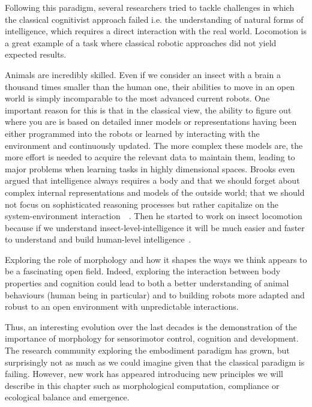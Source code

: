 Following this paradigm, several researchers tried to tackle challenges in which the classical cognitivist approach failed i.e. the understanding of natural forms of intelligence, which requires a direct interaction with the real world. Locomotion is a great example of a task where classical robotic approaches did not yield expected results.

Animals are incredibly skilled. Even if we consider an insect with a brain a thousand times smaller than the human one, their abilities to move in an open world is simply incomparable to the most advanced current robots. One important reason for this is that in the classical view, the ability to figure out where you are is based on detailed inner models or representations having been either programmed into the robots or learned by interacting with the environment and continuously updated. The more complex these models are, the more effort is needed to acquire the relevant data to maintain them, leading to major problems when learning tasks in highly dimensional spaces. Brooks even argued that intelligence always requires a body and that we should forget about complex internal representations and models of the outside world; that we should not focus on sophisticated reasoning processes but rather capitalize on the system-environment interaction~\parencite{brooks1991intelligence}~\parencite{brooks1995intelligence}. Then he started to work on insect locomotion because if we understand insect-level-intelligence it will be much easier and faster to understand and build human-level intelligence~\parencite{brooks1996prospects}.

Exploring the role of morphology and how it shapes the ways we think appears to be a fascinating open field. Indeed, exploring the interaction between body properties and cognition could lead to both a better understanding of animal behaviours (human being in particular) and to building robots more adapted and robust to an open environment with unpredictable interactions.

Thus, an interesting evolution over the last decades is the demonstration of the importance of morphology for sensorimotor control, cognition and development. The research community exploring the embodiment paradigm has grown, but surprisingly not as much as we could imagine given that the classical paradigm is failing. However, new work has appeared introducing new principles we will describe in this chapter such as morphological computation, compliance or ecological balance and emergence.

